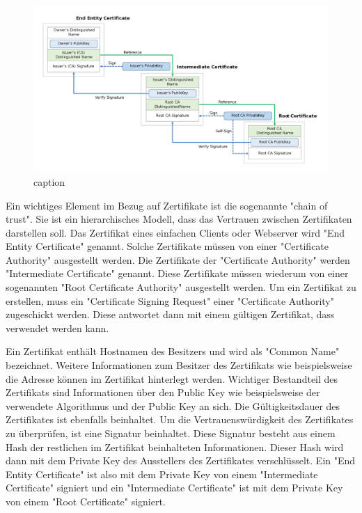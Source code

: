 \begin{figure}[H]
    \centering
    \includegraphics{media/OpenSSL/cert.png}
    \caption{caption} %
\end{figure}

Ein wichtiges Element im Bezug auf Zertifikate ist die sogenannte "chain of trust". Sie ist ein hierarchisches Modell, dass das Vertrauen zwischen Zertifikaten darstellen soll. Das Zertifikat eines einfachen Clients oder Webserver wird "End Entity Certificate" genannt. Solche Zertifikate müssen von einer "Certificate Authority" ausgestellt werden. Die Zertifikate der "Certificate Authority" werden "Intermediate Certificate" genannt. Diese Zertifikate müssen wiederum von einer sogenannten "Root Certificate Authority" ausgestellt werden. Um ein Zertifikat zu erstellen, muss ein "Certificate Signing Request" einer "Certificate Authority" zugeschickt werden. Diese antwortet dann mit einem gültigen Zertifikat, dass verwendet werden kann.

Ein Zertifikat enthält Hostnamen des Besitzers und wird als "Common Name" bezeichnet. Weitere Informationen zum Besitzer des Zertifikats wie beispielsweise die Adresse können im Zertifikat hinterlegt werden. Wichtiger Bestandteil des Zertifikats sind Informationen über den Public Key wie beispielsweise der verwendete Algorithmus und der Public Key an sich. Die Gültigkeitsdauer des Zertifikates ist ebenfalls beinhaltet. Um die Vertrauenswürdigkeit des Zertifikates zu überprüfen, ist eine Signatur beinhaltet. Diese Signatur besteht aus einem Hash der restlichen im Zertifikat beinhalteten Informationen. Dieser Hash wird dann mit dem Private Key des Ausstellers des Zertifikates verschlüsselt. Ein "End Entity Certificate" ist also mit dem Private Key von einem "Intermediate Certificate" signiert und ein "Intermediate Certificate" ist mit dem Private Key von einem "Root Certificate" signiert.

